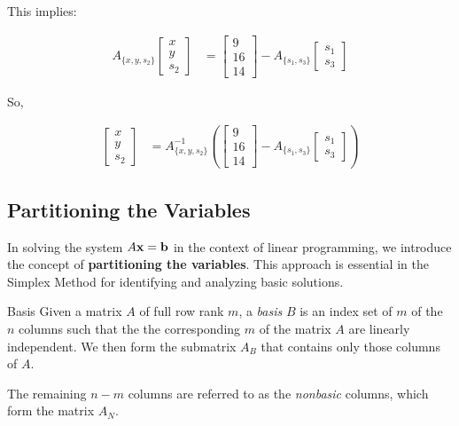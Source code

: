 \bigskip

This implies:

\begin{align*}
A_{\{x, y, s_2\}} 
\begin{bmatrix}
x \\ y \\ s_2
\end{bmatrix}
&=
\begin{bmatrix}
9 \\ 16 \\ 14
\end{bmatrix}
-
A_{\{s_1, s_3\}}
\begin{bmatrix}
s_1 \\ s_3
\end{bmatrix}
\end{align*}

\bigskip

So,

\begin{align*}
\begin{bmatrix}
x \\ y \\ s_2
\end{bmatrix}
&=
A_{\{x, y, s_2\}}^{-1}
\left(
\begin{bmatrix}
9 \\ 16 \\ 14
\end{bmatrix}
-
A_{\{s_1, s_3\}}
\begin{bmatrix}
s_1 \\ s_3
\end{bmatrix}
\right)
\end{align*}

\subsection{Partitioning the Variables}

In solving the system \( A\mathbf{x} =\mathbf{b}\) in the context of linear programming, we introduce the concept of \textbf{partitioning the variables}. This approach is essential in the Simplex Method for identifying and analyzing basic solutions.

\begin{definition}{Basis}{}{}
Given a matrix $A$ of full row rank $m$, a \emph{basis} $B$ is an index set of $m$ of the $n$ columns such that the the corresponding $m$  of the matrix $A$ are linearly independent.  We then form the submatrix $A_B$ that contains only those columns of $A$. 

 The remaining \( n - m \) columns are referred to as the \emph{nonbasic} columns, which form the matrix \( A_N \). 
 \end{definition}
 
